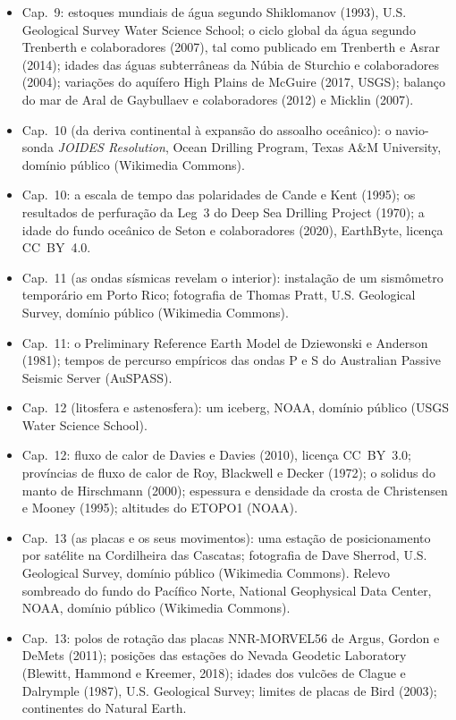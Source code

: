\begin{itemize}
  \item Cap.~9: estoques mundiais de água segundo Shiklomanov (1993), U.S. Geological Survey Water Science School; o ciclo global da água segundo Trenberth e colaboradores (2007), tal como publicado em Trenberth e Asrar (2014); idades das águas subterrâneas da Núbia de Sturchio e colaboradores (2004); variações do aquífero High Plains de McGuire (2017, USGS); balanço do mar de Aral de Gaybullaev e colaboradores (2012) e Micklin (2007).
  \item Cap.~10 (da deriva continental à expansão do assoalho oceânico): o navio-sonda \emph{JOIDES Resolution}, Ocean Drilling Program, Texas A\&M University, domínio público (Wikimedia Commons).
  \item Cap.~10: a escala de tempo das polaridades de Cande e Kent (1995); os resultados de perfuração da Leg~3 do Deep Sea Drilling Project (1970); a idade do fundo oceânico de Seton e colaboradores (2020), EarthByte, licença CC~BY~4.0.
  \item Cap.~11 (as ondas sísmicas revelam o interior): instalação de um sismômetro temporário em Porto Rico; fotografia de Thomas Pratt, U.S. Geological Survey, domínio público (Wikimedia Commons).
  \item Cap.~11: o Preliminary Reference Earth Model de Dziewonski e Anderson (1981); tempos de percurso empíricos das ondas P e S do Australian Passive Seismic Server (AuSPASS).
  \item Cap.~12 (litosfera e astenosfera): um iceberg, NOAA, domínio público (USGS Water Science School).
  \item Cap.~12: fluxo de calor de Davies e Davies (2010), licença CC~BY~3.0; províncias de fluxo de calor de Roy, Blackwell e Decker (1972); o solidus do manto de Hirschmann (2000); espessura e densidade da crosta de Christensen e Mooney (1995); altitudes do ETOPO1 (NOAA).
  \item Cap.~13 (as placas e os seus movimentos): uma estação de posicionamento por satélite na Cordilheira das Cascatas; fotografia de Dave Sherrod, U.S. Geological Survey, domínio público (Wikimedia Commons). Relevo sombreado do fundo do Pacífico Norte, National Geophysical Data Center, NOAA, domínio público (Wikimedia Commons).
  \item Cap.~13: polos de rotação das placas NNR-MORVEL56 de Argus, Gordon e DeMets (2011); posições das estações do Nevada Geodetic Laboratory (Blewitt, Hammond e Kreemer, 2018); idades dos vulcões de Clague e Dalrymple (1987), U.S. Geological Survey; limites de placas de Bird (2003); continentes do Natural Earth.

\end{itemize}
